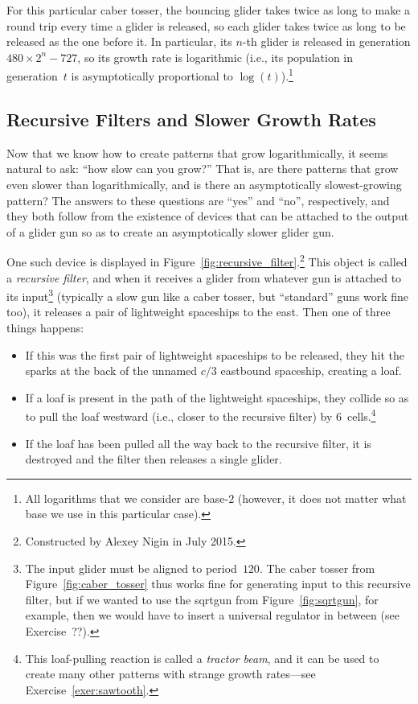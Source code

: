 For this particular caber tosser, the bouncing glider takes twice as long to make a round trip every time a glider is released, so each glider takes twice as long to be released as the one before it. In particular, its $n$-th glider is released in generation $480 \times 2^n - 727$, so its growth rate is logarithmic (i.e., its population in generation~$t$ is asymptotically proportional to $\log(t)$).\footnote{All logarithms that we consider are base-$2$ (however, it does not matter what base we use in this particular case).}


\subsection{Recursive Filters and Slower Growth Rates}\label{sec:recursive_filter}

Now that we know how to create patterns that grow logarithmically, it seems natural to ask: ``how slow can you grow?'' That is, are there patterns that grow even slower than logarithmically, and is there an asymptotically slowest-growing pattern? The answers to these questions are ``yes'' and ``no'', respectively, and they both follow from the existence of devices that can be attached to the output of a glider gun so as to create an asymptotically slower glider gun.

One such device is displayed in Figure~\ref{fig:recursive_filter}.\footnote{Constructed by Alexey Nigin in July 2015.} This object is called a \emph{recursive filter}, and when it receives a glider from whatever gun is attached to its input\footnote{The input glider must be aligned to period~$120$. The caber tosser from Figure~\ref{fig:caber_tosser} thus works fine for generating input to this recursive filter, but if we wanted to use the sqrtgun from Figure~\ref{fig:sqrtgun}, for example, then we would have to insert a universal regulator in between (see Exercise~??).} (typically a slow gun like a caber tosser, but ``standard'' guns work fine too), it releases a pair of lightweight spaceships to the east. Then one of three things happens:\smallskip

\begin{itemize}
	\item[1)] If this was the first pair of lightweight spaceships to be released, they hit the sparks at the back of the unnamed $c/3$ eastbound spaceship, creating a loaf.\smallskip
	
	\item[2)] If a loaf is present in the path of the lightweight spaceships, they collide so as to pull the loaf westward (i.e., closer to the recursive filter) by $6$~cells.\footnote{This loaf-pulling reaction is called a \emph{tractor beam}, and it can be used to create many other patterns with strange growth rates---see Exercise~\ref{exer:sawtooth}.}\smallskip
	
	\item[3)] If the loaf has been pulled all the way back to the recursive filter, it is destroyed and the filter then releases a single glider.\smallskip
\end{itemize}

